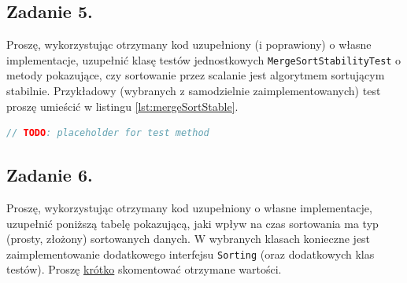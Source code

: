 \documentclass[twoside]{article}
\begin{document}
\newpage
\subsection{Zadanie 5.}

Proszę, wykorzystując otrzymany kod uzupełniony (i poprawiony) o własne implementacje, uzupełnić klasę testów jednostkowych \verb|MergeSortStabilityTest| o metody pokazujące, czy sortowanie przez
scalanie jest algorytmem sortującym stabilnie.
Przykładowy (wybranych z samodzielnie zaimplementowanych) test proszę umieścić w listingu \ref{lst:mergeSortStable}.

\begin{lstlisting}[caption={Przykładowa metoda testowa dla MergeSort pokazująca, że algorytm jest stabilny.},
frame=tblr, language=Java, label=lst:mergeSortStable]
// TODO: placeholder for test method
\end{lstlisting}


\newpage
\subsection{Zadanie 6.}

Proszę, wykorzystując otrzymany kod uzupełniony o własne implementacje, uzupełnić poniższą tabelę 
pokazującą, jaki wpływ na czas sortowania ma typ (prosty, złożony) sortowanych danych.
W wybranych klasach konieczne jest zaimplementowanie dodatkowego interfejsu \verb|Sorting| 
(oraz dodatkowych klas testów).
Proszę \underline{krótko} skomentować otrzymane wartości.
\end{document}
